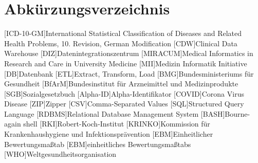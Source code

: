 \section*{Abkürzungsverzeichnis}
\begin{acronym}[acrmeta]		
	[ICD-10-GM]{International Statistical Classification of Diseases and Related Health Problems, 10. Revision, German Modification}
	[CDW]{Clinical Data Warehouse}
	[DIZ]{Datenintegrationszentrum}
	[MIRACUM]{Medical Informatics in Research and Care in University Medicine}
	[MII]{Medizin Informatik Initiative}
	[DB]{Datenbank}
	[ETL]{Extract, Transform, Load}
	[BMG]{Bundesministeriums für Gesundheit}
	[BfArM]{Bundesinstitut für Arzneimittel und Medizinprodukte}
	[SGB]{Sozialgesetzbuch}
	[Alpha-ID]{Alpha-Identifikator}
	[COVID]{Corona Virus Disease}
	[ZIP]{Zipper}
	[CSV]{Comma-Separated Values}
	[SQL]{Structured Query Language}
	[RDBMS]{Relational Database Management System}
	[BASH]{Bourne-again shell}
	[RKI]{Robert-Koch-Institut}
	[KRINKO]{Kommission für Krankenhaushygiene und Infektionsprävention}
	[EBM]{Einheitlicher Bewertungsmaßtab}
	[EBM]{einheitliches Bewertungsmaßtabs}
	[WHO]{Weltgesundheitsorganisation}
	
	
\end{acronym}
